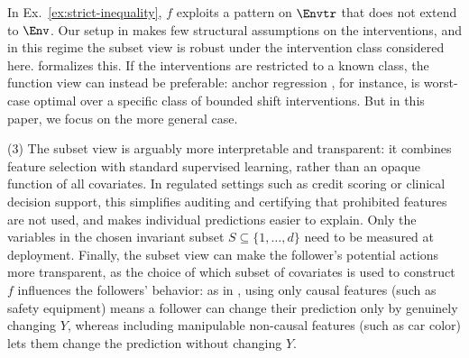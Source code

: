 In Ex.~\ref{ex:strict-inequality}, $f$ exploits a pattern on $\Envtr$ that does not extend to $\Env$. Our setup in  makes few structural assumptions on the interventions, and in this regime the subset view is robust under the intervention class considered here.  formalizes this. If the interventions are restricted to a known class, the function view can instead be preferable: anchor regression \citep{rothenhauslerAnchorRegressionHeterogeneous2020}, for instance, is worst-case optimal over a specific class of bounded shift interventions. But in this paper, we focus on the more general case.

(3)
The subset view is arguably more interpretable and transparent: it combines feature selection with standard supervised learning, rather than an opaque function of all covariates. In regulated settings such as credit scoring or clinical decision support, this simplifies auditing and certifying that prohibited features are not used, and makes individual predictions easier to explain. Only the variables in the chosen invariant subset $S \subseteq \{1, \ldots, d\}$ need to be measured at deployment.
Finally, the subset view can make the follower's potential actions
more transparent, as the choice of which subset of covariates is used to construct $f$ influences the followers' behavior: as in , using only causal features (such as safety equipment) means a follower can change their prediction only by genuinely changing $Y$, whereas including manipulable non-causal features (such as car color) lets them change the prediction without changing $Y$.









